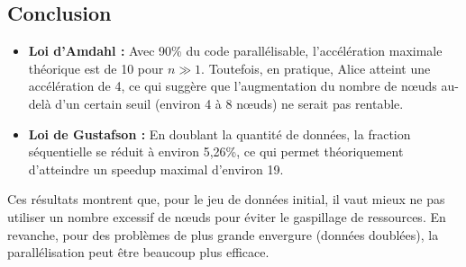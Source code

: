 \documentclass[a4paper,13pt]{book}
\begin{document}
\subsection{Conclusion}

\begin{itemize}
    \item \textbf{Loi d’Amdahl :} Avec 90\% du code parallélisable, l’accélération maximale théorique est de 10 pour \( n \gg 1 \). Toutefois, en pratique, Alice atteint une accélération de 4, ce qui suggère que l’augmentation du nombre de nœuds au-delà d’un certain seuil (environ 4 à 8 nœuds) ne serait pas rentable.
    \item \textbf{Loi de Gustafson :} En doublant la quantité de données, la fraction séquentielle se réduit à environ 5,26\%, ce qui permet théoriquement d’atteindre un speedup maximal d’environ 19.
\end{itemize}

Ces résultats montrent que, pour le jeu de données initial, il vaut mieux ne pas utiliser un nombre excessif de nœuds pour éviter le gaspillage de ressources. En revanche, pour des problèmes de plus grande envergure (données doublées), la parallélisation peut être beaucoup plus efficace.
\end{document}
